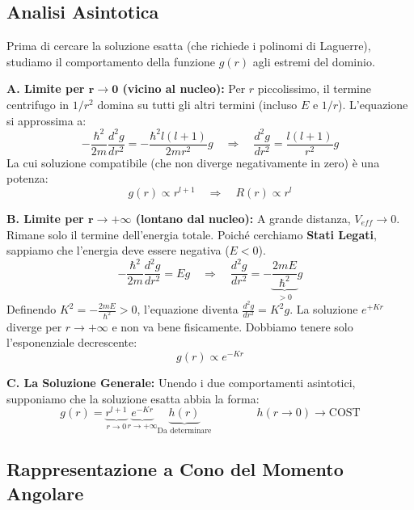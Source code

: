 \documentclass[11pt, a4paper]{article}
\begin{document}
\subsection{Analisi Asintotica} %

Prima di cercare la soluzione esatta (che richiede i polinomi di Laguerre), studiamo il comportamento della funzione $g(r)$ agli estremi del dominio. %

\noindent
\textbf{A. Limite per $\mathbf{r \to 0}$ (vicino al nucleo):} %
Per $r$ piccolissimo, il termine centrifugo in $1/r^2$ domina su tutti gli altri termini (incluso $E$ e $1/r$). L'equazione si approssima a: %
\begin{equation*}
    -\frac{\hbar^2}{2m} \frac{d^2 g}{dr^2} = -\frac{\hbar^2 l(l+1)}{2mr^2} g \quad \Rightarrow \quad \frac{d^2 g}{dr^2} = \frac{l(l+1)}{r^2} g %
\end{equation*}
La cui soluzione compatibile (che non diverge negativamente in zero) è una potenza: %
\begin{equation}
    g(r) \propto r^{l+1} \quad \Rightarrow \quad R(r) \propto r^l %
\end{equation}

\noindent
\textbf{B. Limite per $\mathbf{r \to +\infty}$ (lontano dal nucleo):} %
A grande distanza, $V_{eff} \to 0$. Rimane solo il termine dell'energia totale. Poiché cerchiamo \textbf{Stati Legati}, sappiamo che l'energia deve essere negativa ($E < 0$). %
\begin{equation*}
    -\frac{\hbar^2}{2m} \frac{d^2 g}{dr^2} = E g \quad \Rightarrow \quad \frac{d^2 g}{dr^2} = -\underbrace{\frac{2mE}{\hbar^2}}_{> 0} g %
\end{equation*}
Definendo $K^2 = -\frac{2mE}{\hbar^2} > 0$, l'equazione diventa $\frac{d^2 g}{dr^2} = K^2 g$. %
La soluzione $e^{+Kr}$ diverge per $r \to +\infty$ e non va bene fisicamente. Dobbiamo tenere solo l'esponenziale decrescente: %
\begin{equation}
    g(r) \propto e^{-Kr} %
\end{equation}

\noindent
\textbf{C. La Soluzione Generale:} %
Unendo i due comportamenti asintotici, supponiamo che la soluzione esatta abbia la forma: %
\begin{equation}
    \boxed{ g(r) = \underbrace{r^{l+1}}_{r \to 0} \underbrace{e^{-Kr}}_{r \to +\infty} \underbrace{h(r)}_{\text{Da determinare}} } \qquad \qquad h(r \to 0) \to \text{COST}  %
\end{equation}

\subsection{Rappresentazione a Cono del Momento Angolare} %
\end{document}
